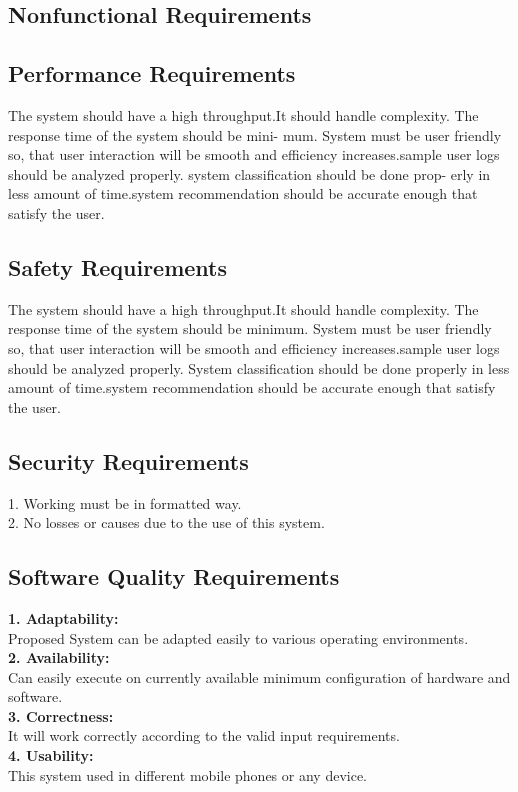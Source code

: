\documentclass[a4paper,12pt]{report}
\begin{document}
\begin{itemize}
\section{Nonfunctional Requirements}
\subsection{Performance Requirements}
The system should have a high throughput.It should handle
complexity. The response time of the system should be mini-
mum. System must be user friendly so, that user interaction will
be smooth and efficiency increases.sample user logs should be
analyzed properly. system classification should be done prop-
erly in less amount of time.system recommendation should be
accurate enough that satisfy the user.
\subsection{Safety Requirements}
The system should have a high throughput.It should handle
complexity. The response time of the system should be minimum. System must be user friendly so, that user interaction will
be smooth and efficiency increases.sample user logs should be
analyzed properly. System classification should be done properly in less amount of time.system recommendation should be
accurate enough that satisfy the user.
\subsection{Security Requirements}
1. Working must be in formatted way. \\
2. No losses or causes due to the use of this system. \\
\subsection{Software Quality Requirements}
\textbf{1. Adaptability:}\\ Proposed System can be adapted easily to various
operating environments. \\\newline
\textbf{2. Availability:}\\ Can easily execute on currently available minimum
configuration of hardware and software. \\\newline
\textbf{3. Correctness:}\\ It will work correctly according to the valid input
requirements. \\\newline
\textbf{4. Usability:}\\ This system used in different mobile phones or any
device. \\

\end{itemize}
\end{document}
